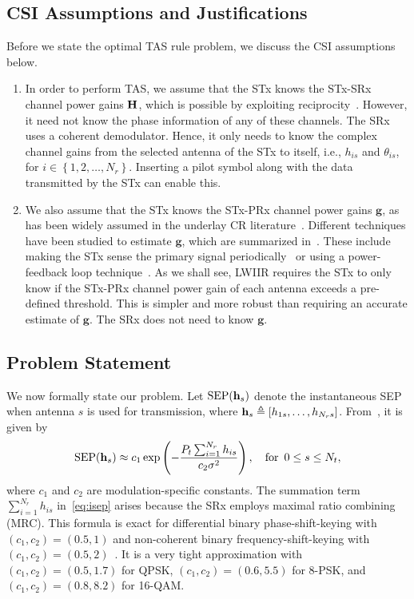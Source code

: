 \documentclass[12pt,draftcls,peerreview,onecolumn]{IEEEtran}
\newcommand{\define}{\triangleq}
\newcommand{\ie}{{i.e.}}
\newcommand{\mtx}[1]{{\bf #1}} %
\newcommand{\SEP}{\text{SEP}}
\newcommand{\Nt}{{N_t}}
\newcommand{\Nr}{{N_r}}
\newcommand{\Pt}{{P_t}}
\newcommand{\such}{h}
\newcommand{\puch}{g}
\newcommand{\hk}[1]{{\such_{#1}}}
\newcommand{\g}{\mathbf{\puch}}
\newcommand{\noisevar}{\sigma^2}
\newcommand{\cone}{c_{1}}
\newcommand{\ctwo}{c_{2}}
\newcommand{\nropts}{\left\{1,2,\ldots,\Nr\right\}}
\newcommand{\suchph}{\theta}
\newcommand{\thetahk}{\suchph_{is}}
\newcommand{\Hmx}{\mtx{H}}
\newcommand{\sumnr}{\sum_{i=1}^{\Nr}}
\begin{document}
\subsection{CSI Assumptions and Justifications}  
Before we state the optimal TAS rule problem, we discuss the  CSI assumptions below. 
\begin{enumerate}
\item In order to perform TAS, we assume that the STx knows the STx-SRx channel power gains $\Hmx$, which is possible by exploiting reciprocity~\cite{Hanif_2015_globecom,Sarvendranath_2013_TCOM,Wang_2010_TWC,RZhang_2009_TWC,Sarvendranath_2014_TCOM}. However, it need not know the phase information of any of these channels. The SRx uses a coherent demodulator. Hence, it only needs to know the complex channel gains from the selected antenna of the STx to itself, \ie, $\hk{is}$ and $\thetahk$, for $i\in\nropts$. Inserting a pilot symbol along with the data transmitted by the STx can enable this.  

\item We also assume that the STx knows the STx-PRx channel power gains $\g$, as has been widely assumed in the underlay CR literature~\cite{Hanif_2015_globecom,Sarvendranath_2013_TCOM,Sarvendranath_2014_TCOM,Kong_2011_JCN,Wang_2010_TWC,RZhang_2009_TWC}. Different techniques have been studied to estimate  $\g$, which are summarized in~\cite{Zhang_2017_tcom}. These include making the STx sense the primary signal periodically~\cite{Zhao_2008_TSP} or using a power-feedback loop technique~\cite{RZhang_2008_DSAN}. As we shall see, LWIIR  requires the STx to only know if the STx-PRx channel power gain of each antenna exceeds a pre-defined threshold. This is simpler and more robust than requiring an accurate estimate of $\g$. The SRx does not need to know $\g$. 

\end{enumerate}

\subsection{Problem Statement}
We now formally state our problem. Let $\SEP(\hs)$ denote the instantaneous SEP when antenna $s$ is used for transmission, where $\hs\define\left[\hk{1s},\ldots,\hk{\Nr s} \right]$. From~\cite[(14)]{Chung_2001_TCom}, it is given by  
\begin{equation}
\SEP(\hs) \approx \cone \exp\left({-\frac{\Pt\sumnr\hk{is}}{\ctwo\noisevar} }\right), \quad\text{for} \,\,\, 0\leq s \leq \Nt,
\label{eq:isep}
\end{equation} 
where $\cone$ and $\ctwo$ are modulation-specific constants. The summation term $\sumnr\hk{is}$ in~\eqref{eq:isep} arises because the SRx employs maximal ratio combining (MRC). This formula is exact for differential binary phase-shift-keying  with $(\cone,\ctwo) = (0.5,1)$  and non-coherent binary frequency-shift-keying  with  $(\cone,\ctwo) = (0.5,2)$~\cite{Fakhan_2014_TSP}. It is a very tight approximation with $(\cone,\ctwo)=(0.5,1.7)$ for QPSK,  $(\cone,\ctwo)=(0.6,5.5)$ for 8-PSK, and  $(\cone,\ctwo )=(0.8,8.2)$ for 16-QAM. %
\end{document}
